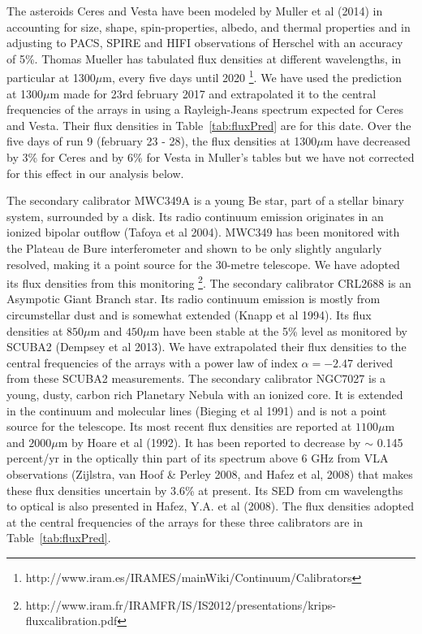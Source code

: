 The asteroids Ceres and Vesta have been modeled by Muller et al (2014) in accounting for 
size, shape, spin-properties, albedo, and thermal properties and in adjusting to PACS, SPIRE and HIFI observations
of Herschel with an accuracy of 5\%. 
Thomas Mueller has tabulated flux densities at different wavelengths, in particular at 1300$\mu$m, every five days
until 2020 \footnote{http://www.iram.es/IRAMES/mainWiki/Continuum/Calibrators}.
We have used the prediction at  1300$\mu$m made for  23rd february 2017
and extrapolated it  to the central frequencies of the arrays in using a Rayleigh-Jeans
spectrum expected for Ceres and Vesta. Their flux densities in
Table~\ref{tab:fluxPred} are for this date. Over the five days of  run 9 (february 23 - 28), the
flux densities  at 1300$\mu$m  have decreased by  3\% 
for Ceres and  by 6\%  for Vesta in Muller's tables but we have not corrected for this effect in our analysis below.  

The secondary calibrator MWC349A is a young Be star, part of a stellar binary system, surrounded by a disk. Its radio
continuum emission originates in an ionized bipolar outflow (Tafoya et al 2004).
MWC349 has been monitored with the  Plateau de Bure interferometer
and shown to be only slightly angularly resolved, making it a point source for the 30-metre telescope. We have adopted
its flux densities from this monitoring \footnote{http://www.iram.fr/IRAMFR/IS/IS2012/presentations/krips-fluxcalibration.pdf}.
The secondary calibrator CRL2688 is an Asympotic Giant Branch star. Its radio continuum emission is mostly from circumstellar dust and
is somewhat extended  (Knapp et al 1994).
Its flux densities at $850\mu$m  and $450\mu$m  have been stable at the 5\% level as monitored by SCUBA2 (Dempsey et al 2013).
We have extrapolated their flux densities to the central frequencies
of the arrays with a power law of index $\alpha=-2.47$ derived from these SCUBA2 measurements.
The secondary calibrator NGC7027 is a young, dusty, carbon rich Planetary Nebula with an ionized core.
It is extended in the continuum and molecular lines (Bieging et al 1991) and  is not a point source for the telescope.
Its  most recent flux densities are reported at $1100\mu$m  and $2000\mu$m by Hoare et al (1992). It has been reported
to decrease by $\sim$ 0.145 percent/yr in the optically thin part of its spectrum above  $6$ GHz from VLA
observations (Zijlstra, van Hoof \& Perley 2008, and Hafez et al, 2008) that makes these flux densities uncertain by 3.6\%
at present. Its SED from cm wavelengths to optical is also presented in Hafez, Y.A. et al (2008).
The flux densities adopted at the central frequencies of the arrays for these three calibrators are in Table~\ref{tab:fluxPred}.


